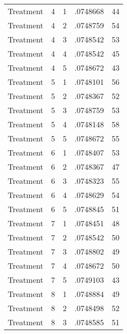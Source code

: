 \begin{tabular}{l*{4}{c}}
Treatment           &           4&           1&    .0748668&          44\\
Treatment           &           4&           2&    .0748759&          54\\
Treatment           &           4&           3&    .0748542&          53\\
Treatment           &           4&           4&    .0748542&          45\\
Treatment           &           4&           5&    .0748672&          43\\
Treatment           &           5&           1&    .0748101&          56\\
Treatment           &           5&           2&    .0748367&          52\\
Treatment           &           5&           3&    .0748759&          53\\
Treatment           &           5&           4&    .0748148&          58\\
Treatment           &           5&           5&    .0748672&          55\\
Treatment           &           6&           1&    .0748407&          53\\
Treatment           &           6&           2&    .0748367&          47\\
Treatment           &           6&           3&    .0748323&          55\\
Treatment           &           6&           4&    .0748629&          54\\
Treatment           &           6&           5&    .0748845&          51\\
Treatment           &           7&           1&    .0748451&          48\\
Treatment           &           7&           2&    .0748542&          50\\
Treatment           &           7&           3&    .0748802&          49\\
Treatment           &           7&           4&    .0748672&          50\\
Treatment           &           7&           5&    .0749103&          43\\
Treatment           &           8&           1&    .0748884&          49\\
Treatment           &           8&           2&    .0748498&          52\\
Treatment           &           8&           3&    .0748585&          51\\

\end{tabular}
